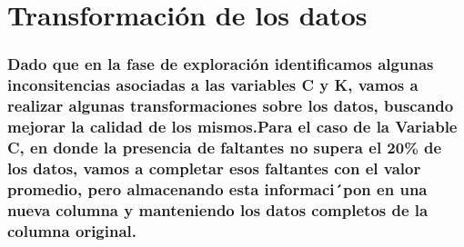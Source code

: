 \documentclass[]{article}
\newenvironment{Shaded}{\begin{snugshade}}{\end{snugshade}}
\newcommand{\DataTypeTok}[1]{\textcolor[rgb]{0.13,0.29,0.53}{#1}}
\newcommand{\KeywordTok}[1]{\textcolor[rgb]{0.13,0.29,0.53}{\textbf{#1}}}
\newcommand{\NormalTok}[1]{#1}
\newcommand{\OperatorTok}[1]{\textcolor[rgb]{0.81,0.36,0.00}{\textbf{#1}}}
\newcommand{\OtherTok}[1]{\textcolor[rgb]{0.56,0.35,0.01}{#1}}
\newcommand{\StringTok}[1]{\textcolor[rgb]{0.31,0.60,0.02}{#1}}
\begin{document}
\hypertarget{transformaciuxf3n-de-los-datos}{%
\section{Transformación de los
datos}\label{transformaciuxf3n-de-los-datos}}

\hypertarget{dado-que-en-la-fase-de-exploraciuxf3n-identificamos-algunas-inconsitencias-asociadas-a-las-variables-c-y-k-vamos-a-realizar-algunas-transformaciones-sobre-los-datos-buscando-mejorar-la-calidad-de-los-mismos.para-el-caso-de-la-variable-c-en-donde-la-presencia-de-faltantes-no-supera-el-20-de-los-datos-vamos-a-completar-esos-faltantes-con-el-valor-promedio-pero-almacenando-esta-informacipon-en-una-nueva-columna-y-manteniendo-los-datos-completos-de-la-columna-original.}{%
\subsubsection{Dado que en la fase de exploración identificamos algunas
inconsitencias asociadas a las variables C y K, vamos a realizar algunas
transformaciones sobre los datos, buscando mejorar la calidad de los
mismos.Para el caso de la Variable C, en donde la presencia de faltantes
no supera el 20\% de los datos, vamos a completar esos faltantes con el
valor promedio, pero almacenando esta informaci´pon en una nueva columna
y manteniendo los datos completos de la columna
original.}\label{dado-que-en-la-fase-de-exploraciuxf3n-identificamos-algunas-inconsitencias-asociadas-a-las-variables-c-y-k-vamos-a-realizar-algunas-transformaciones-sobre-los-datos-buscando-mejorar-la-calidad-de-los-mismos.para-el-caso-de-la-variable-c-en-donde-la-presencia-de-faltantes-no-supera-el-20-de-los-datos-vamos-a-completar-esos-faltantes-con-el-valor-promedio-pero-almacenando-esta-informacipon-en-una-nueva-columna-y-manteniendo-los-datos-completos-de-la-columna-original.}}

\begin{Shaded}
\end{Shaded}
\end{document}
